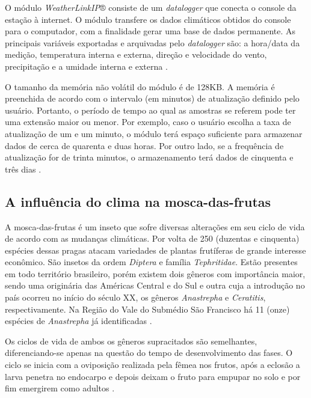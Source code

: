 \newpage

O módulo \textit{WeatherLinkIP}® consiste de um \textit{datalogger} que conecta o console da estação à internet. O módulo transfere os dados climáticos obtidos do console para o computador, com a finalidade gerar uma base de dados permanente. As principais variáveis exportadas e arquivadas pelo \textit{datalogger} são: a hora/data da medição, temperatura interna e externa, direção e velocidade do vento, precipitação e a umidade interna e externa \cite{WLIP}.

O tamanho da memória não volátil do módulo é de 128KB. A memória é preenchida de acordo com o intervalo (em minutos) de atualização definido pelo usuário. Portanto, o período de tempo ao qual as amostras se referem pode ter uma extensão maior ou menor. Por exemplo, caso o usuário escolha a taxa de atualização de um e um minuto, o módulo terá espaço suficiente para armazenar dados de cerca de quarenta e duas horas. Por outro lado, se a frequência de atualização for de trinta minutos, o armazenamento terá dados de cinquenta e três dias \cite{WLIP}.

\subsection{A influência do clima na mosca-das-frutas}

A mosca-das-frutas é um inseto que sofre diversas alterações em seu ciclo de vida de acordo com as mudanças climáticas. Por volta de 250 (duzentas e cinquenta) espécies dessas pragas atacam variedades de plantas frutíferas de grande interesse econômico. São insetos da ordem \textit{Diptera} e família \textit{Tephritidae}. Estão presentes em todo território brasileiro, porém existem dois gêneros com importância maior, sendo uma originária das Américas Central e do Sul e outra cuja a introdução no país ocorreu no início do século XX, os gêneros \textit{Anastrepha} e \textit{Ceratitis}, respectivamente. Na Região do Vale do Submédio São Francisco há 11 (onze) espécies de \textit{Anastrepha} já identificadas \cite{paranhos2008moscas}.

Os ciclos de vida de ambos os gêneros supracitados são semelhantes, diferencia\-ndo-se apenas na questão do tempo de desenvolvimento das fases. O ciclo se inicia com a oviposição realizada pela fêmea nos frutos, após a eclosão a larva penetra no endocarpo e depois deixam o fruto para empupar no solo e por fim emergirem como adultos \cite{paranhos2008moscas}.
  
